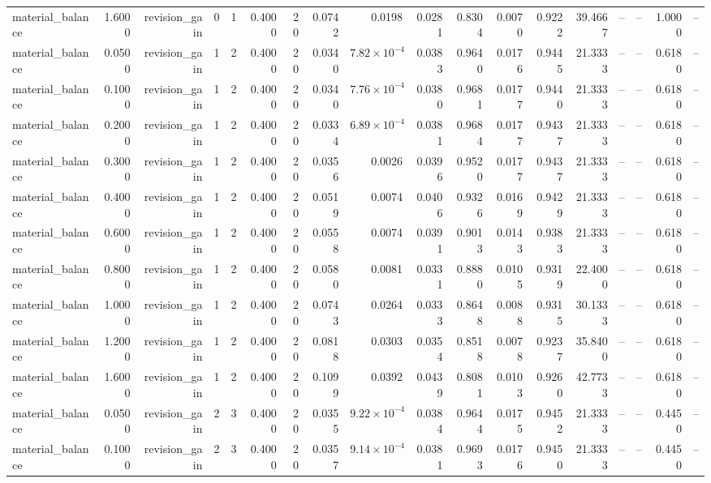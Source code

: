 \begin{table}[htbp]
\begin{tabular}{lrrrrrrrrrrrrrrrrr}
material\_balance & 1.6000 & revision\_gain & 0 & 1 & 0.4000 & 20 & 0.0742 & 0.0198 & 0.0281 & 0.8304 & 0.0070 & 0.9222 & 39.4667 & -- & -- & 1.0000 & -- \\
material\_balance & 0.0500 & revision\_gain & 1 & 2 & 0.4000 & 20 & 0.0340 & $7.82\times10^{-4}$ & 0.0383 & 0.9640 & 0.0176 & 0.9445 & 21.3333 & -- & -- & 0.6180 & -- \\
material\_balance & 0.1000 & revision\_gain & 1 & 2 & 0.4000 & 20 & 0.0340 & $7.76\times10^{-4}$ & 0.0380 & 0.9681 & 0.0177 & 0.9440 & 21.3333 & -- & -- & 0.6180 & -- \\
material\_balance & 0.2000 & revision\_gain & 1 & 2 & 0.4000 & 20 & 0.0334 & $6.89\times10^{-4}$ & 0.0381 & 0.9684 & 0.0177 & 0.9437 & 21.3333 & -- & -- & 0.6180 & -- \\
material\_balance & 0.3000 & revision\_gain & 1 & 2 & 0.4000 & 20 & 0.0356 & 0.0026 & 0.0396 & 0.9520 & 0.0177 & 0.9437 & 21.3333 & -- & -- & 0.6180 & -- \\
material\_balance & 0.4000 & revision\_gain & 1 & 2 & 0.4000 & 20 & 0.0519 & 0.0074 & 0.0406 & 0.9326 & 0.0169 & 0.9429 & 21.3333 & -- & -- & 0.6180 & -- \\
material\_balance & 0.6000 & revision\_gain & 1 & 2 & 0.4000 & 20 & 0.0558 & 0.0074 & 0.0391 & 0.9013 & 0.0143 & 0.9383 & 21.3333 & -- & -- & 0.6180 & -- \\
material\_balance & 0.8000 & revision\_gain & 1 & 2 & 0.4000 & 20 & 0.0580 & 0.0081 & 0.0331 & 0.8880 & 0.0105 & 0.9319 & 22.4000 & -- & -- & 0.6180 & -- \\
material\_balance & 1.0000 & revision\_gain & 1 & 2 & 0.4000 & 20 & 0.0743 & 0.0264 & 0.0333 & 0.8648 & 0.0088 & 0.9315 & 30.1333 & -- & -- & 0.6180 & -- \\
material\_balance & 1.2000 & revision\_gain & 1 & 2 & 0.4000 & 20 & 0.0818 & 0.0303 & 0.0354 & 0.8518 & 0.0078 & 0.9237 & 35.8400 & -- & -- & 0.6180 & -- \\
material\_balance & 1.6000 & revision\_gain & 1 & 2 & 0.4000 & 20 & 0.1099 & 0.0392 & 0.0439 & 0.8081 & 0.0103 & 0.9260 & 42.7733 & -- & -- & 0.6180 & -- \\
material\_balance & 0.0500 & revision\_gain & 2 & 3 & 0.4000 & 20 & 0.0355 & $9.22\times10^{-4}$ & 0.0384 & 0.9644 & 0.0175 & 0.9452 & 21.3333 & -- & -- & 0.4450 & -- \\
material\_balance & 0.1000 & revision\_gain & 2 & 3 & 0.4000 & 20 & 0.0357 & $9.14\times10^{-4}$ & 0.0381 & 0.9693 & 0.0176 & 0.9450 & 21.3333 & -- & -- & 0.4450 & -- \\

\end{tabular}
\end{table}
